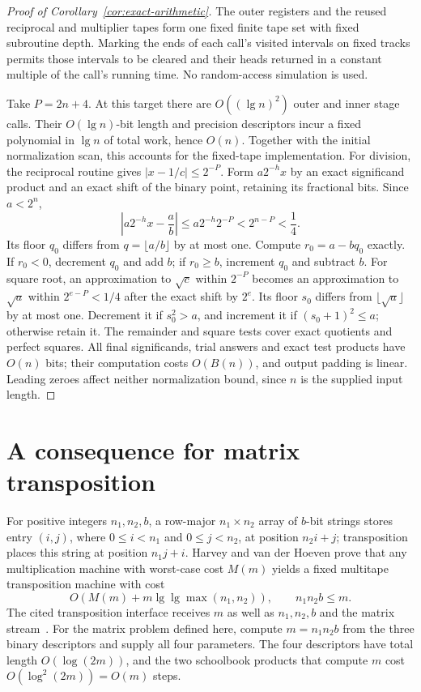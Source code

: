 \documentclass[11pt]{article}
\theoremstyle{definition}
\begin{document}
\begin{proof}[Proof of Corollary~\ref{cor:exact-arithmetic}]
The outer registers and the reused reciprocal and multiplier tapes form
one fixed finite tape set with fixed subroutine depth. Marking the ends
of each call's visited intervals on fixed tracks permits those intervals
to be cleared and their heads returned in a constant multiple of the
call's running time. No random-access simulation is used.

Take $P=2n+4$. At this target there are $O((\lg n)^2)$ outer and inner
stage calls. Their $O(\lg n)$-bit length and precision descriptors incur
a fixed polynomial in $\lg n$ of total work, hence $O(n)$. Together with
the initial normalization scan, this accounts for the fixed-tape
implementation. For division, the reciprocal routine gives
$|x-1/c|\le2^{-P}$. Form $a2^{-h}x$ by an exact significand product
and an exact shift of the binary point, retaining its fractional bits.
Since $a<2^n$,
\[
 \left|a2^{-h}x-\frac ab\right|
 \le a2^{-h}2^{-P}<2^{n-P}<\frac14.
\]
Its floor $q_0$ differs from $q=\lfloor a/b\rfloor$ by at most one.
Compute $r_0=a-bq_0$ exactly. If $r_0<0$, decrement $q_0$ and add $b$;
if $r_0\ge b$, increment $q_0$ and subtract $b$.
For square root, an approximation to $\sqrt c$ within $2^{-P}$ becomes
an approximation to $\sqrt a$ within $2^{e-P}<1/4$ after the exact
shift by $2^e$. Its floor $s_0$ differs from $\lfloor\sqrt a\rfloor$
by at most one. Decrement it if $s_0^2>a$, and increment it if
$(s_0+1)^2\le a$; otherwise retain it. The remainder and square tests
cover exact quotients and perfect squares. All final significands, trial
answers and exact test products have $O(n)$ bits; their computation costs
$O(B(n))$, and output padding is linear. Leading zeroes
affect neither normalization bound, since $n$ is the supplied input
length.
\end{proof}
 \section{A consequence for matrix transposition}
\label{sec:transposition}

For positive integers $n_1,n_2,b$, a row-major $n_1\times n_2$ array
of $b$-bit strings stores
entry $(i,j)$, where $0\le i<n_1$ and $0\le j<n_2$, at position
$n_2i+j$; transposition places this string at position $n_1j+i$.
Harvey and van der Hoeven prove that any multiplication machine with
worst-case cost $M(m)$ yields a fixed multitape transposition machine with
cost~\cite[Corollary~6.2]{HarveyHoeven2025}
\[
O\!\left(M(m)+m\lg\lg\max(n_1,n_2)\right),
 \qquad n_1n_2b\le m.
\]
The cited transposition interface receives $m$ as well as $n_1,n_2,b$
and the matrix stream~\cite[Section~1.1]{HarveyHoeven2025}. For the
matrix problem defined here, compute $m=n_1n_2b$ from the three binary
descriptors and supply all four parameters. The four descriptors have total length
$O(\log(2m))$, and the two schoolbook products that compute $m$ cost
$O(\log^2(2m))=O(m)$ steps.
\end{document}
